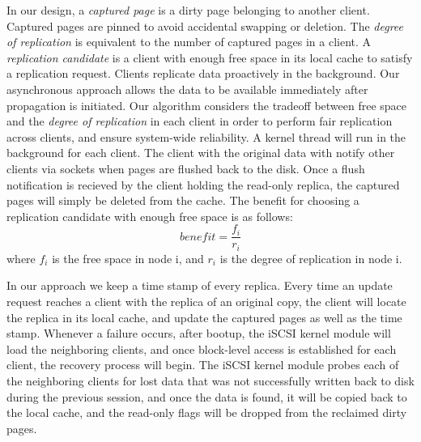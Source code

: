 In our design, a \textit{captured page} is a dirty page belonging to another client. Captured pages are pinned to avoid accidental swapping or deletion. The \textit{degree of replication} is equivalent to the number of captured pages in a client. A \textit{replication candidate} is a client with enough free space in its local cache to satisfy a replication request. Clients replicate data proactively in the background. Our asynchronous approach allows the data to be available immediately after propagation is initiated. Our algorithm considers the tradeoff between free space and the \textit{degree of replication} in each client in order to perform fair replication across clients, and ensure system-wide reliability. A kernel thread will run in the background for each client. The client with the original data with notify other clients via sockets when pages are flushed back to the disk. Once a flush notification is recieved by the client holding the read-only replica, the captured pages will simply be deleted from the cache. The benefit for choosing a replication candidate with enough free space is as follows: \[{benefit}=\frac{f_i}{r_i}\] where $f_i$ is the free space in node i, and $r_i$ is the degree of replication in node i.

In our approach we keep a time stamp of every replica. Every time an update request reaches a client with the replica of an original copy, the client will locate the replica in its local cache, and update the captured pages as well as the time stamp. Whenever a failure occurs, after bootup, the iSCSI kernel module will load the neighboring clients, and once block-level access is established for each client, the recovery process will begin. The iSCSI kernel module probes each of the neighboring clients for lost data that was not successfully written back to disk during the previous session, and once the data is found, it will be copied back to the local cache, and the read-only flags will be dropped from the reclaimed dirty pages.

\label{approach}

